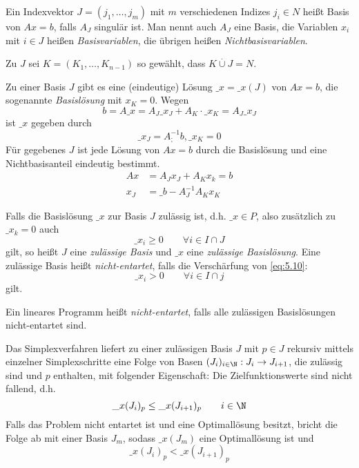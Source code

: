\documentclass[a4paper]{scrartcl}
\numberwithin{equation}{section}
\begin{document}
\begin{df}
	\label{df:5.8}
	Ein Indexvektor $J=(j_1,\dotsc,j_m)$ mit $m$ verschiedenen Indizes $j_i\in N$ heißt Basis von $Ax=b$, 
	falls $A_J$ singulär ist.
	Man nennt auch $A_J$ eine Basis, die Variablen $x_i$ mit $i\in J$ heißen \emph{Basisvariablen}, die übrigen heißen \emph{Nichtbasisvariablen}.

Zu $J$ sei $K=(K_1,\dotsc, K_{n-1})$ so gewählt, dass $K\stackrel \cdot \cup J = N$.

Zu einer Basis $J$ gibt es eine (eindeutige) Lösung $\_x=\_x(J)$ von $Ax=b$, die sogenannte \emph{Basislösung} mit $x_K=0$.
Wegen 
\[
	b = A\_x = A_J \_x_J + A_K \cdot \_x_K = A_J\_x_J
\]
ist $\_x$ gegeben durch
\begin{equation}
	\label{eq:5.8}
	\_x_J = A_;^{-1}b, \_x_K = 0
\end{equation}
Für gegebenes $J$ ist jede Lösung von $Ax=b$ durch die Basislösung und eine Nichtbasisanteil eindeutig bestimmt.
\begin{align*}
	Ax &=A_J x_J + A_K x_k = b\\
	x_J &= \_b - A_J^{-1}A_Kx_K \tag{5.9}\label{eq:5.9}
\end{align*}
\setcounter{equation}{9}

Falls die Basislösung $\_x$ zur Basis $J$ zulässig ist, d.h. $\_x\in P$, also zusätzlich zu $\_x_k=0$ auch
\begin{equation}
	\label{eq:5.10}
	\_x_i \ge 0 \qquad \forall i\in I\cap J
\end{equation}
gilt, so heißt $J$ eine \emph{zulässige Basis} und $\_x$ eine \emph{zulässige Basislösung}.
Eine zulässige Basis heißt \emph{nicht-entartet}, falls die Verschärfung von \ref{eq:5.10}:
\begin{equation}
	\label{eq:5.11}
	\_x_i > 0 \qquad \forall i\in I\cap j
\end{equation}
gilt.

Ein lineares Programm heißt \emph{nicht-entartet}, falls alle zulässigen Basislösungen nicht-entartet sind.
\end{df}

Das Simplexverfahren liefert zu einer zulässigen Basis $J$ mit $p\in J$ rekursiv mittels einzelner Simplexschritte eine Folge von Basen $(J_i)_{i\in\N} : J_i \to J_{i+1}$, die zulässig sind und $p$ enthalten, mit folgender Eigenschaft:
Die Zielfunktionswerte sind nicht fallend, d.h.
\[
	\_x(J_i)_p \le \_x(J_{i+1})_p \qquad i\in \N
\]
Falls das Problem nicht entartet ist und eine Optimallösung besitzt, bricht die Folge ab mit einer Basis $J_m$, sodass $\_x(J_m)$ eine Optimallösung ist und
\[
	\_x(J_i)_p < \_x(J_{i+1})_p
\]
\end{document}
